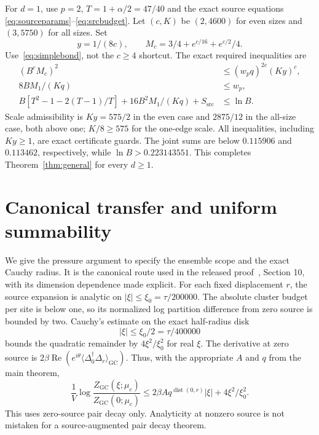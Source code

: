 \documentclass[11pt]{article}
\theoremstyle{plain}
\theoremstyle{remark}
\DeclareMathOperator{\dist}{dist}
\newcommand{\GC}{\mathrm{GC}}
\newcommand{\src}{\mathrm{src}}
\begin{document}
For $d=1$, use $p=2$, $T=1+\alpha/2=47/40$ and the exact source equations
\eqref{eq:sourceparams}--\eqref{eq:srcbudget}. Let $(c,K)$ be $(2,4600)$ for
even sizes and $(3,5750)$ for all sizes. Set
\[
y=1/(8c),\qquad M_c=3/4+e^{c/16}+e^{c/2}/4.
\]
Use~\eqref{eq:simplebond}, not the $c\ge4$ shortcut. The exact required
inequalities are
\begin{align}
(B^cM_c)^2&\le(w_pq)^{2c}(Ky)^c,\label{eq:d1tail}\\
8BM_1/(Kq)&\le w_p,\label{eq:d1one}\\
B[T^2-1-2(T-1)/T]+16B^2M_1/(Kq)+S_{\src}&\le\ln B.\label{eq:d1kp}
\end{align}
Scale admissibility is $Ky=575/2$ in the even case and $2875/12$ in the
all-size case, both above one; $K/8\ge575$ for the one-edge scale.
All inequalities, including $Ky\ge1$, are exact certificate guards.
The joint sums are below $0.115906$ and $0.113462$, respectively, while
$\ln B>0.223143551$.
This completes Theorem~\ref{thm:general} for every $d\ge1$.

\section{Canonical transfer and uniform summability}\label{sec:canonical}

We give the pressure argument to specify the ensemble scope and the exact
Cauchy radius. It is the canonical route used in the released
proof~\cite{rensSharp}, Section 10, with its dimension dependence made explicit.
For each fixed displacement $r$, the source expansion is analytic on
$|\xi|\le\xi_0=\tau/200000$. The absolute cluster budget per site is below
one, so its normalized log partition difference from zero source is bounded
by two. Cauchy's estimate on the exact half-radius disk
\begin{equation}\label{eq:cauchydisk}
|\xi|\le\xi_0/2=\tau/400000
\end{equation}
bounds the quadratic remainder by $4\xi^2/\xi_0^2$ for real $\xi$.
The derivative at zero source is
$2\beta\operatorname{Re}(e^{i\theta}\langle\Delta_0^\dagger\Delta_r\rangle_\GC)$.
Thus, with the appropriate $A$ and $q$ from the main theorem,
\begin{equation}\label{eq:pressure}
\frac1V\log\frac{Z_\GC(\xi;\mu_c)}{Z_\GC(0;\mu_c)}
\le2\beta A q^{\dist(0,r)}|\xi|+4\xi^2/\xi_0^2.
\end{equation}
This uses zero-source pair decay only. Analyticity at nonzero source is not
mistaken for a source-augmented pair decay theorem.
\end{document}
